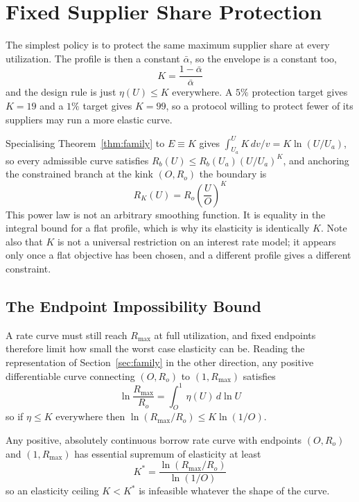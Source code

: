 \documentclass[11pt,a4paper]{article}
\begin{document}
\section{Fixed Supplier Share Protection}
\label{sec:fixed}

The simplest policy is to protect the same maximum supplier share at every utilization. The profile is then a constant $\bar\alpha$, so the envelope is a constant too,
\[
\boxed{
K=\frac{1-\bar\alpha}{\bar\alpha}
}
\]
and the design rule is just $\eta(U)\leq K$ everywhere. A $5\%$ protection target gives $K=19$ and a $1\%$ target gives $K=99$, so a protocol willing to protect fewer of its suppliers may run a more elastic curve.

Specialising Theorem~\ref{thm:family} to $E\equiv K$ gives $\int_{U_a}^{U}K\,dv/v=K\ln(U/U_a)$, so every admissible curve satisfies $R_b(U)\leq R_b(U_a)(U/U_a)^K$, and anchoring the constrained branch at the kink $(O,R_o)$ the boundary is
\[
\boxed{
R_K(U)=R_o\left(\frac{U}{O}\right)^K
}
\]
This power law is not an arbitrary smoothing function. It is equality in the integral bound for a flat profile, which is why its elasticity is identically $K$. Note also that $K$ is not a universal restriction on an interest rate model; it appears only once a flat objective has been chosen, and a different profile gives a different constraint.

\subsection{The Endpoint Impossibility Bound}
\label{sec:endpoint}

A rate curve must still reach $R_{\max}$ at full utilization, and fixed endpoints therefore limit how small the worst case elasticity can be. Reading the representation of Section~\ref{sec:family} in the other direction, any positive differentiable curve connecting $(O,R_o)$ to $(1,R_{\max})$ satisfies
\[
\ln\frac{R_{\max}}{R_o}
=\int_O^1 \eta(U)\,d\ln U
\]
so if $\eta\leq K$ everywhere then $\ln(R_{\max}/R_o)\leq K\ln(1/O)$.

\begin{theorem}
\label{thm:kstar}
Any positive, absolutely continuous borrow rate curve with endpoints $(O,R_o)$ and $(1,R_{\max})$ has essential supremum of elasticity at least
\[
\boxed{
K^*=\frac{\ln(R_{\max}/R_o)}{\ln(1/O)}
}
\]
so an elasticity ceiling $K<K^*$ is infeasible whatever the shape of the curve.
\end{theorem}
\end{document}
